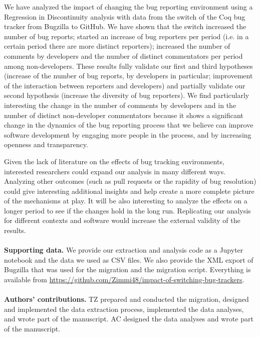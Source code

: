 \documentclass[runningheads]{llncs}
\begin{document}
We have analyzed the impact of changing the bug reporting environment using a Regression in Discontinuity analysis with data from the switch of the Coq bug tracker from Bugzilla to GitHub.  We have shown that the switch increased the number of bug reports; started an increase of bug reporters per period (i.e. in a certain period there are more distinct reporters); increased the number of comments by developers and the number of distinct commentators per period among non-developers. These results fully validate our first and third hypotheses (increase of the number of bug reports, by developers in particular; improvement of the interaction between reporters and developers) and partially validate our second hypothesis (increase the diversity of bug reporters). We find particularly interesting the change in the number of comments by developers and in the number of distinct non-developer commentators because it shows a significant change in the dynamics of the bug reporting process that we believe can improve software development by engaging more people in the process, and by increasing openness and transparency.  

Given the lack of literature on the effects of bug tracking environments, interested researchers could expand our analysis in many different ways. Analyzing other outcomes (such as pull requests or the rapidity of bug resolution) could give interesting additional insights and help create a more complete picture of the mechanisms at play. It will be also interesting to analyze the effects on a longer period to see if the changes hold in the long run. Replicating our analysis for different contexts and software would increase the external validity of the results.

\scriptsize
\paragraph{}
\noindent \footnotesize{\textbf{Supporting data.}}
We provide our extraction and analysis code as a Jupyter notebook and the data we used as CSV files. We also provide the XML export of Bugzilla that was used for the migration and the migration script. Everything is available from \url{https://github.com/Zimmi48/impact-of-switching-bug-trackers}.
\paragraph{}
\noindent \footnotesize{\textbf{Authors' contributions.}}
TZ prepared and conducted the migration, designed and implemented the data extraction process, implemented the data analyses, and wrote part of the manuscript. AC designed the data analyses and wrote part of the manuscript.
\end{document}
